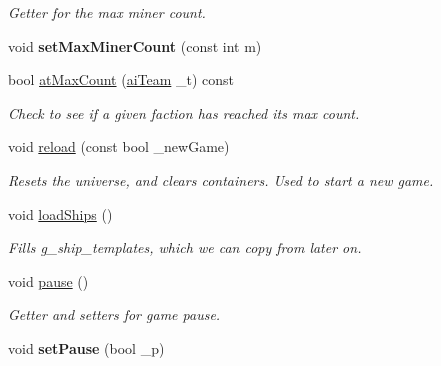\begin{DoxyCompactItemize}
\begin{DoxyCompactList}\small\item\em Getter for the max miner count. \end{DoxyCompactList}\item 
\hypertarget{classuniverse_a7e45dbd5f966aec0b90ba9d122586637}{void {\bfseries set\-Max\-Miner\-Count} (const int m)}\label{classuniverse_a7e45dbd5f966aec0b90ba9d122586637}

\item 
\hypertarget{classuniverse_aaaca317c6f2a23053c28550580e16d5c}{bool \hyperlink{classuniverse_aaaca317c6f2a23053c28550580e16d5c}{at\-Max\-Count} (\hyperlink{enemy_8hpp_abac1fdbabb5a6be5f0d6ae40be5c5a58}{ai\-Team} \-\_\-t) const }\label{classuniverse_aaaca317c6f2a23053c28550580e16d5c}

\begin{DoxyCompactList}\small\item\em Check to see if a given faction has reached its max count. \end{DoxyCompactList}\item 
void \hyperlink{classuniverse_aa3bb66d17df83723a112dc75cd44fdcc}{reload} (const bool \-\_\-new\-Game)
\begin{DoxyCompactList}\small\item\em Resets the universe, and clears containers. Used to start a new game. \end{DoxyCompactList}\item 
\hypertarget{classuniverse_a7246a93d0a18354e7b35f7f48f595ffa}{void \hyperlink{classuniverse_a7246a93d0a18354e7b35f7f48f595ffa}{load\-Ships} ()}\label{classuniverse_a7246a93d0a18354e7b35f7f48f595ffa}

\begin{DoxyCompactList}\small\item\em Fills g\-\_\-ship\-\_\-templates, which we can copy from later on. \end{DoxyCompactList}\item 
\hypertarget{classuniverse_ac311a26eb9b23ee745e93b94f358e6fb}{void \hyperlink{classuniverse_ac311a26eb9b23ee745e93b94f358e6fb}{pause} ()}\label{classuniverse_ac311a26eb9b23ee745e93b94f358e6fb}

\begin{DoxyCompactList}\small\item\em Getter and setters for game pause. \end{DoxyCompactList}\item 
\hypertarget{classuniverse_a45ec0b47345bb1d4dc324f09100e9286}{void {\bfseries set\-Pause} (bool \-\_\-p)}\label{classuniverse_a45ec0b47345bb1d4dc324f09100e9286}


\end{DoxyCompactItemize}
